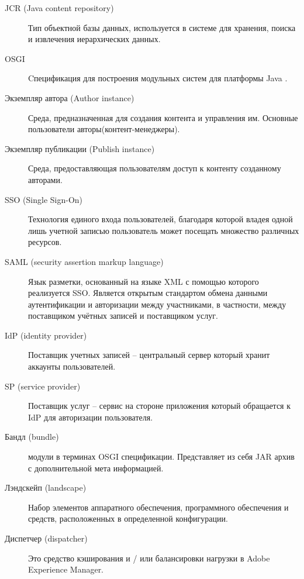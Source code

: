 \Abbreviations %
\begin{description}
\item[JCR (Java content repository)] Тип объектной базы данных, используется в системе для хранения, поиска и извлечения иерархических данных.
\item[OSGI] Cпецификация для построения модульных систем для платформы Java \cite{web:osgiSite}.
\item[Экземпляр автора (Author instance)] Среда, предназначенная для создания контента и управления им. Основные пользователи авторы(контент-менеджеры).
\item[Экземпляр публикации (Publish instance)] Среда, предоставляющая пользователям доступ к контенту созданному авторами.
\item[SSO (Single Sign-On)] Технология единого входа пользователей, благодаря которой владея одной лишь учетной записью пользователь может посещать множество различных ресурсов.
\item[SAML (security assertion markup language)] Язык разметки, основанный на языке XML с помощью которого реализуется SSO. Является открытым стандартом обмена данными аутентификации и авторизации между участниками, в частности, между поставщиком учётных записей и поставщиком услуг.
\item[IdP (identity provider)] Поставщик учетных записей – центральный сервер который хранит аккаунты пользователей.
\item[SP (service provider)] Поставщик услуг – сервис на стороне приложения который обращается к IdP для авторизации пользователя.
\item[Бандл (bundle)] модули в терминах OSGI спецификации. Представляет из себя JAR архив с дополнительной мета информацией.
\item[Лэндскейп (landscape)] Набор элементов аппаратного обеспечения, программного обеспечения и средств, расположенных в определенной конфигурации.
\item[Диспетчер (dispatcher)] Это средство кэширования и / или балансировки нагрузки в Adobe Experience Manager.

\end{description}

